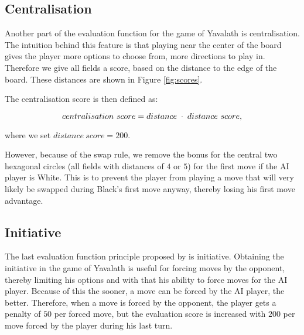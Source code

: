 \documentclass[11pt]{article}
\begin{document}
\subsection{Centralisation}
\label{-subsec:centralisation}
Another part of the evaluation function for the game of Yavalath is centralisation. The intuition behind this feature is that playing near the center of the board gives the player more options to choose from, \ie more directions to play in. Therefore we give all fields a score, based on the distance to the edge of the board. These distances are shown in Figure \ref{fig:scores}. 



The centralisation score is then defined as:

\begin{equation}
	centralisation\ score = distance \;\cdot\; distance\ score,
\end{equation}

where we set $distance\ score = 200$.

However, because of the swap rule, we remove the bonus for the central two hexagonal circles (all fields with distances of $4$ or $5$) for the first move if the AI player is White. This is to prevent the player from playing a move that will very likely be swapped during Black's first move anyway, thereby losing his first move advantage.

\subsection{Initiative}
\label{-subsec:initiative}
The last evaluation function principle proposed by \cite{Winands2004} is initiative. Obtaining the initiative in the game of Yavalath is useful for forcing moves by the opponent, thereby limiting his options and with that his ability to force moves for the AI player. Because of this the sooner, a move can be forced by the AI player, the better. Therefore, when a move is forced by the opponent, the player gets a penalty of $50$ per forced move, but the evaluation score is increased with $200$ per move forced by the player during his last turn.
\end{document}
